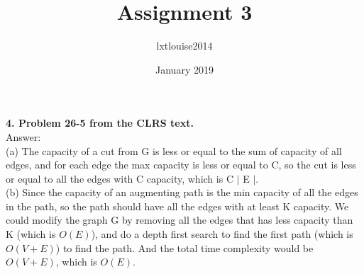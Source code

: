 \documentclass{article}
\title{Assignment 3}
\author{lxtlouise2014 }
\date{January 2019}
\begin{document}
\maketitle
\textbf{4. Problem 26-5 from the CLRS text.} \\
\noindent
Answer: \\
(a) The capacity of a cut from G is less or equal to the sum of capacity of all edges, and for each edge the max capacity is less or equal to C, so the cut is less or equal to all the edges with C capacity, which is C $|$ E $|$.\\
\newline
(b) Since the capacity of an augmenting path is the min capacity of all the edges in the path, so the path should have all the edges with at least K capacity. We could modify the graph G by removing all the edges that has less capacity than K (which is $O(E)$), and do a depth first search to find the first path (which is $O(V+E)$) to find the path. And the total time complexity would be $O(V+E)$, which is $O(E)$. 
\newline
\end{document}
